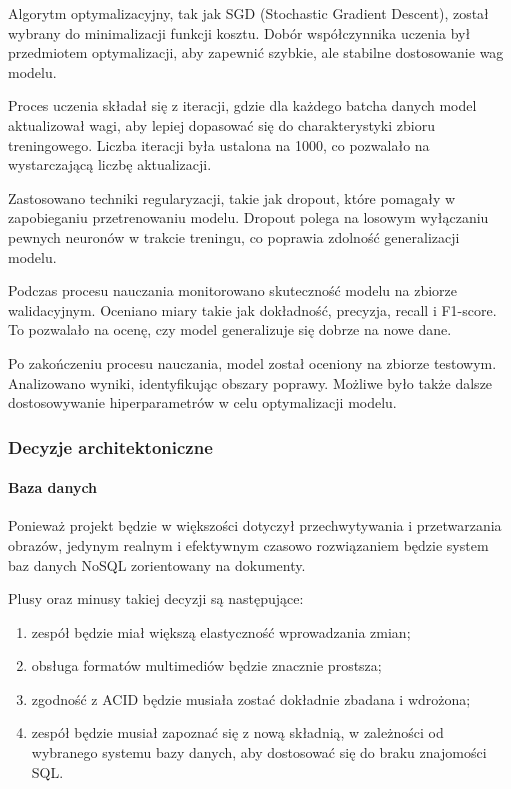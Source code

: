 \documentclass[12pt, a4paper, twoside, openany]{book}
\newcommand{\forceindent}{\leavevmode{\parindent=1.3em\indent}}
\begin{document}
Algorytm optymalizacyjny, tak jak SGD (Stochastic Gradient Descent), został wybrany do minimalizacji funkcji kosztu.
Dobór współczynnika uczenia był przedmiotem optymalizacji, aby zapewnić szybkie, ale stabilne dostosowanie wag modelu.

Proces uczenia składał się z iteracji, gdzie dla każdego batcha danych model aktualizował wagi, aby lepiej dopasować się do charakterystyki zbioru treningowego.
Liczba iteracji była ustalona na 1000, co pozwalało na wystarczającą liczbę aktualizacji.

Zastosowano techniki regularyzacji, takie jak dropout, które pomagały w zapobieganiu przetrenowaniu modelu.
Dropout polega na losowym wyłączaniu pewnych neuronów w trakcie treningu, co poprawia zdolność generalizacji modelu.

Podczas procesu nauczania monitorowano skuteczność modelu na zbiorze walidacyjnym.
Oceniano miary takie jak dokładność, precyzja, recall i F1-score. %
To pozwalało na ocenę, czy model generalizuje się dobrze na nowe dane.

Po zakończeniu procesu nauczania, model został oceniony na zbiorze testowym. Analizowano wyniki, identyfikując obszary poprawy.
Możliwe było także dalsze dostosowywanie hiperparametrów w celu optymalizacji modelu.

\subsubsection{Decyzje architektoniczne}

\paragraph{Baza danych\\}
\forceindent Ponieważ projekt będzie w większości dotyczył przechwytywania i przetwarzania obrazów, jedynym realnym i efektywnym czasowo rozwiązaniem będzie system baz danych NoSQL zorientowany na dokumenty.

Plusy oraz minusy takiej decyzji są następujące:
\begin{enumerate}[label=--]
    \item zespół będzie miał większą elastyczność wprowadzania zmian;
    \item obsługa formatów multimediów będzie znacznie prostsza;
    \item zgodność z ACID będzie musiała zostać dokładnie zbadana i wdrożona;
    \item zespół będzie musiał zapoznać się z nową składnią, w zależności od wybranego systemu bazy danych, aby dostosować się do braku znajomości SQL.
\end{enumerate}
\end{document}
